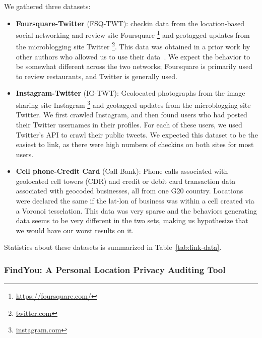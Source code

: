 We gathered three datasets:
\begin{itemize}
  \item \textbf{Foursquare-Twitter} (FSQ-TWT): 
  checkin data from the location-based social networking and review site Foursquare \footnote{\url{https://foursquare.com/}} and geotagged updates from the microblogging site Twitter \footnote{\url{twitter.com}}. 
  This data was obtained in a prior work by other authors who allowed us to use their data~\cite{Zhang:2014ij}.
  We expect the behavior to be somewhat different across the two networks; Foursquare is primarily used to review restaurants, and Twitter is generally used.

  \item \textbf{Instagram-Twitter} (IG-TWT):
  Geolocated photographs from the image sharing site Instagram \footnote{\url{instagram.com}} and geotagged updates from the microblogging site Twitter.
  We first crawled Instagram, and then found users who had posted their Twitter usernames in their profiles.
  For each of these users, we used Twitter's API to crawl their public tweets.
  We expected this dataset to be the easiest to link, as there were high numbers of checkins on both sites for most users.

  \item \textbf{Cell phone-Credit Card} (Call-Bank):
  Phone calls associated with geolocated cell towers (CDR) and credit or debit card transaction data associated with geocoded businesses, all from one G20 country.
  Locations were declared the same if the lat-lon of business was within a cell created via a Voronoi tesselation.
  This data was very sparse and the behaviors generating data seems to be very different in the two sets, making us hypothesize that we would have our worst results on it.
\end{itemize}

Statistics about these datasets is summarized in Table~\ref{tab:link-data}.



\subsubsection{FindYou: A Personal Location Privacy Auditing Tool}
